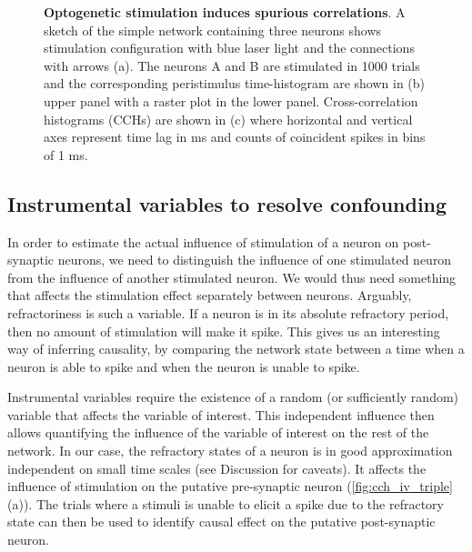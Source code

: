 \documentclass[11pt]{article}
\begin{document}
\begin{figure}
\begin{subfigure}{\textwidth}
\caption{} \label{fig:intro:3}
\end{subfigure}
\caption{{\bf Optogenetic stimulation induces spurious correlations}. 
A sketch of the simple network containing three neurons shows stimulation configuration with blue laser light and the connections with arrows (a). 
The neurons A and B are stimulated in 1000 trials and the corresponding peristimulus time-histogram are shown in (b) upper panel with a raster plot in the lower panel. 
Cross-correlation histograms (CCHs) are shown in (c) where horizontal and vertical axes represent time lag in ms and counts of coincident spikes in bins of 1 ms.}
\label{fig:intro}
\end{figure}

\FloatBarrier
\subsection{Instrumental variables to resolve confounding}
In order to estimate the actual influence of stimulation of a neuron on post-synaptic neurons, we need to distinguish the influence of one stimulated neuron from the influence of another stimulated neuron. 
We would thus need something that affects the stimulation effect separately between neurons. 
Arguably, refractoriness is such a variable. 
If a neuron is in its absolute refractory period, then no amount of stimulation will make it spike. 
This gives us an interesting way of inferring causality, by comparing the network state between a time when a neuron is able to spike and when the neuron is unable to spike.

Instrumental variables require the existence of a random (or sufficiently random) variable that affects the variable of interest. 
This independent influence then allows quantifying the influence of the variable of interest on the rest of the network. 
In our case, the refractory states of a neuron is in good approximation independent on small time scales (see Discussion for caveats). 
It affects the influence of stimulation on the putative pre-synaptic neuron (\cref{fig:cch_iv_triple}(a)). 
The trials where a stimuli is unable to elicit a spike due to the refractory state can then be used to identify causal effect on the putative post-synaptic neuron.
\end{document}
